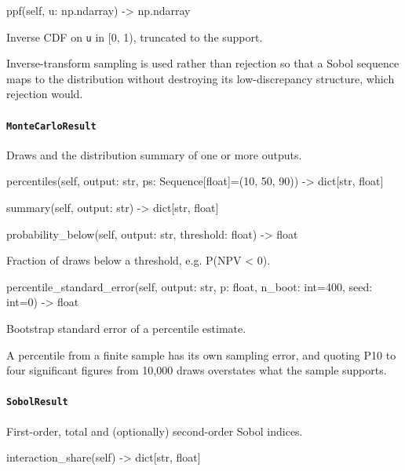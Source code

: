\documentclass[10pt,a4paper,twoside]{report}
\begin{document}
\begin{verbatimsmall}
ppf(self, u: np.ndarray) -> np.ndarray
\end{verbatimsmall}

Inverse CDF on \texttt{u} in [0, 1), truncated to the support.

Inverse-transform sampling is used rather than rejection so that a Sobol sequence maps to the distribution without destroying its low-discrepancy structure, which rejection would.

\paragraph{\texttt{MonteCarloResult}}

Draws and the distribution summary of one or more outputs.

\begin{verbatimsmall}
percentiles(self, output: str, ps: Sequence[float]=(10, 50, 90)) -> dict[str, float]
\end{verbatimsmall}

\begin{verbatimsmall}
summary(self, output: str) -> dict[str, float]
\end{verbatimsmall}

\begin{verbatimsmall}
probability_below(self, output: str, threshold: float) -> float
\end{verbatimsmall}

Fraction of draws below a threshold, e.g. P(NPV < 0).

\begin{verbatimsmall}
percentile_standard_error(self, output: str, p: float, n_boot: int=400, seed: int=0) -> float
\end{verbatimsmall}

Bootstrap standard error of a percentile estimate.

A percentile from a finite sample has its own sampling error, and quoting P10 to four significant figures from 10,000 draws overstates what the sample supports.

\paragraph{\texttt{SobolResult}}

First-order, total and (optionally) second-order Sobol indices.

\begin{verbatimsmall}
interaction_share(self) -> dict[str, float]
\end{verbatimsmall}
\end{document}
